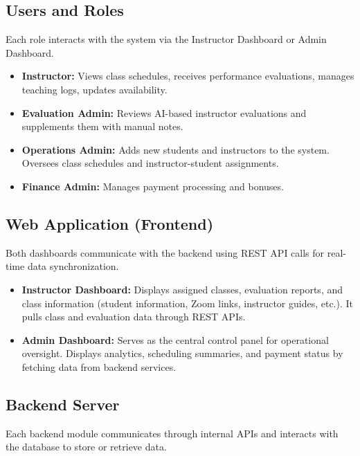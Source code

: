 \subsection{Users and Roles}

Each role interacts with the system via the Instructor Dashboard or Admin Dashboard. 

\begin{itemize}
    \item \textbf{Instructor:} Views class schedules, receives performance evaluations, manages teaching logs, updates availability.
    \item \textbf{Evaluation Admin:} Reviews AI-based instructor evaluations and supplements them with manual notes.
    \item \textbf{Operations Admin:} Adds new students and instructors to the system. Oversees class schedules and instructor-student assignments.
    \item \textbf{Finance Admin:} Manages payment processing and bonuses.
\end{itemize}

\subsection{Web Application (Frontend)}
Both dashboards communicate with the backend using REST API calls for real-time data synchronization.
\begin{itemize}
    \item \textbf{Instructor Dashboard:} Displays assigned classes, evaluation reports, and class information (student information, Zoom links, instructor guides, etc.). It pulls class and evaluation data through REST APIs.
    \item \textbf{Admin Dashboard:} Serves as the central control panel for operational oversight. Displays analytics, scheduling summaries, and payment status by fetching data from backend services.
\end{itemize}

\subsection{Backend Server}

Each backend module communicates through internal APIs and interacts with the database to store or retrieve data.

